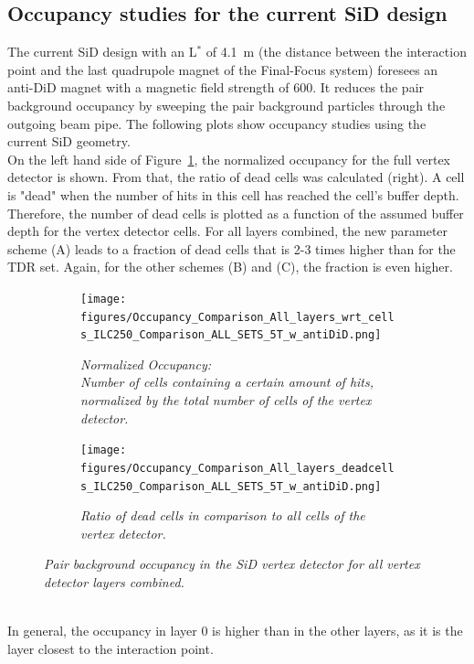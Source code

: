 \subsection{Occupancy studies for the current SiD design}
The current SiD design with an L$^*$ of \SI{4.1}{\meter} (the distance between the interaction point and the last quadrupole magnet of the Final-Focus system) foresees an anti-DiD magnet with a magnetic field strength of \SI{600}{\gauss}.
It reduces the pair background occupancy by sweeping the pair background particles through the outgoing beam pipe.
The following plots show occupancy studies using the current SiD geometry.\\
On the left hand side of Figure~\ref{fig:All_layers_Occupancy}, the normalized occupancy for the full vertex detector is shown.
From that, the ratio of dead cells was calculated (right).
A cell is "dead" when the number of hits in this cell has reached the cell's buffer depth.
Therefore, the number of dead cells is plotted as a function of the assumed buffer depth for the vertex detector cells.
For all layers combined, the new parameter scheme (A) leads to a fraction of dead cells that is 2-3 times higher than for the TDR set.
Again, for the other schemes (B) and (C), the fraction is even higher.
\begin{figure}[!h]
\centering
\begin{subfigure}[t]{0.45\textwidth}
\centering
\texttt{[image: figures/Occupancy\_Comparison\_All\_layers\_wrt\_cells\_ILC250\_Comparison\_ALL\_SETS\_5T\_w\_antiDiD.png]}
\caption{\textit{Normalized Occupancy:\\Number of cells containing a certain amount of hits, normalized by the total number of cells of the vertex detector.}}
\end{subfigure}
\hspace*{0.3cm}
\begin{subfigure}[t]{0.45\textwidth}
\centering
\texttt{[image: figures/Occupancy\_Comparison\_All\_layers\_deadcells\_ILC250\_Comparison\_ALL\_SETS\_5T\_w\_antiDiD.png]}
\caption{\textit{Ratio of dead cells in comparison to all cells of the vertex detector.}}
\end{subfigure}
\caption{\textit{Pair background occupancy in the SiD vertex detector for all vertex detector layers combined.}}
\label{fig:All_layers_Occupancy}
\end{figure}
\\In general, the occupancy in layer 0 is higher than in the other layers, as it is the layer closest to the interaction point.
